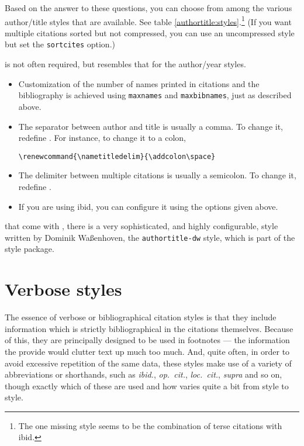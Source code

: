 Based on the answer to these questions, you can choose from among the
various author/title styles that are available. See table
\ref{authortitle:styles}.\footnote{The one missing style seems to be
  the combination of terse citations with ibid.} (If you want multiple
citations sorted but not compressed, you can use an uncompressed style
but set the \verb|sortcites| option.)

 is not often required, but resembles that
for the author/year styles.
\begin{itemize}
\item Customization of the number of names printed in citations and
  the bibliography is achieved using \verb|maxnames| and
  \verb|maxbibnames|, just as described above.
\item The separator between author and title is usually a comma. To
  change it, redefine . For instance, to change it
  to a colon,
\begin{verbatim}
\renewcommand{\nametitledelim}{\addcolon\space}
\end{verbatim}
\item The delimiter between multiple citations is usually a
  semicolon. To change it, redefine .
\item If you are using ibid, you can configure it using the options
  given above.
\end{itemize}

 that come with \biblatex,
there is a very sophisticated, and highly configurable, style written
by Dominik Waßenhoven, the \texttt{authortitle-dw} style, which is
part of the  style package.

\section{Verbose styles}

The essence of verbose or bibliographical citation styles is that they
include information which is strictly bibliographical in the citations
themselves. Because of this, they are principally designed to be used
in footnotes --- the information the provide would clutter text up
much too much. And, quite often, in order to avoid excessive
repetition of the same data, these styles make use of a variety of
abbreviations or shorthands, such as \emph{ibid.}, \emph{op.\ cit.},
\emph{loc.\ cit.}, \emph{supra} and so on, though exactly which of
these are used and how varies quite a bit from style to style.

